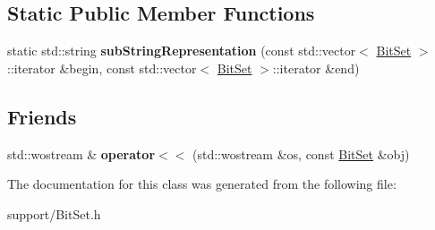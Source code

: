 \subsection*{Static Public Member Functions}
\begin{DoxyCompactItemize}
\item 
\mbox{\label{classantlrcpp_1_1BitSet_a6c3b0d84d2b16b29a6e1ec3a55b32d6f}} 
static std\+::string {\bfseries sub\+String\+Representation} (const std\+::vector$<$ \hyperlink{classantlrcpp_1_1BitSet}{Bit\+Set} $>$\+::iterator \&begin, const std\+::vector$<$ \hyperlink{classantlrcpp_1_1BitSet}{Bit\+Set} $>$\+::iterator \&end)
\end{DoxyCompactItemize}
\subsection*{Friends}
\begin{DoxyCompactItemize}
\item 
\mbox{\label{classantlrcpp_1_1BitSet_aaf73291b783507d962eccd1635aee50f}} 
std\+::wostream \& {\bfseries operator$<$$<$} (std\+::wostream \&os, const \hyperlink{classantlrcpp_1_1BitSet}{Bit\+Set} \&obj)
\end{DoxyCompactItemize}


The documentation for this class was generated from the following file\+:\begin{DoxyCompactItemize}
\item 
support/Bit\+Set.\+h\end{DoxyCompactItemize}
